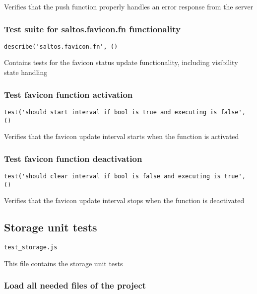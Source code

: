 \documentclass[a4paper]{article}
\begin{document}
Verifies that the push function properly handles an error response
from the server

\hypertarget{toc253}{}
\subsubsection{Test suite for saltos.favicon.fn functionality}

\begin{lstlisting}
describe('saltos.favicon.fn', ()
\end{lstlisting}

Contains tests for the favicon status update functionality,
including visibility state handling

\hypertarget{toc254}{}
\subsubsection{Test favicon function activation}

\begin{lstlisting}
test('should start interval if bool is true and executing is false', ()
\end{lstlisting}

Verifies that the favicon update interval starts when
the function is activated

\hypertarget{toc255}{}
\subsubsection{Test favicon function deactivation}

\begin{lstlisting}
test('should clear interval if bool is false and executing is true', ()
\end{lstlisting}

Verifies that the favicon update interval stops when
the function is deactivated

\hypertarget{toc256}{}
\subsection{Storage unit tests}

\begin{lstlisting}
test_storage.js
\end{lstlisting}

This file contains the storage unit tests

\hypertarget{toc257}{}
\subsubsection{Load all needed files of the project}
\end{document}
